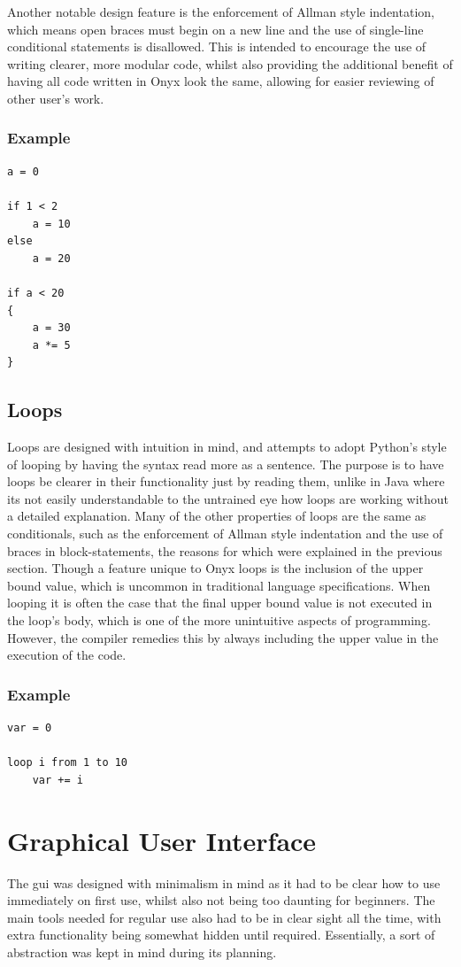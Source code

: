 \documentclass[
]{report}
\begin{document}
Another notable design feature is the enforcement of Allman style
indentation, which means open braces must begin on a new line and the
use of single-line conditional \glspl{statement} is disallowed. This is
intended to encourage the use of writing clearer, more modular code,
whilst also providing the additional benefit of having all code written
in Onyx look the same, allowing for easier reviewing of other user's
work.

\subsubsection{Example}
\begin{verbatim}
a = 0

if 1 < 2
    a = 10
else
    a = 20

if a < 20
{
    a = 30
    a *= 5
}
\end{verbatim}

\subsection{Loops}
Loops are designed with intuition in mind, and attempts to adopt
Python's style of looping by having the syntax read more as a sentence.
The purpose is to have loops be clearer in their functionality just by
reading them, unlike in Java where its not easily understandable to the
untrained eye how loops are working without a detailed explanation. Many
of the other properties of loops are the same as conditionals, such as
the enforcement of Allman style indentation and the use of braces in
\glspl{block-statement}, the reasons for which were explained in the previous
section. Though a feature unique to Onyx loops is the inclusion of the
upper bound value, which is uncommon in traditional language
specifications. When looping it is often the case that the final upper
bound value is not executed in the loop's body, which is one of the more
unintuitive aspects of programming. However, the compiler remedies this
by always including the upper value in the execution of the code.

\subsubsection{Example}
\begin{verbatim}
var = 0

loop i from 1 to 10
    var += i
\end{verbatim}

\section{Graphical User Interface}
The \acrshort{gui} was designed with minimalism in mind as it had to be clear how
to use immediately on first use, whilst also not being too daunting for
beginners. The main tools needed for regular use also had to be in clear
sight all the time, with extra functionality being somewhat hidden until
required. Essentially, a sort of abstraction was kept in mind during its
planning.
\end{document}
